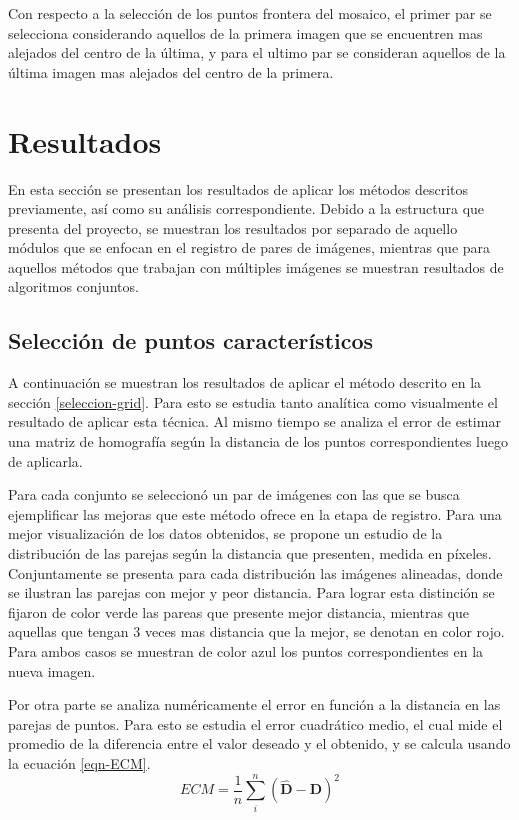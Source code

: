 Con respecto  a la selección de los puntos frontera del mosaico, el primer par se selecciona considerando aquellos de la primera imagen que se encuentren mas alejados del centro de la última, y para el ultimo par se consideran aquellos de la última imagen mas alejados del centro de la primera.

\section{Resultados}

En esta sección se presentan los resultados de aplicar los métodos descritos previamente, así como su análisis correspondiente. Debido a la estructura que presenta del proyecto, se muestran los resultados por separado de aquello módulos que se enfocan en el registro de pares de imágenes, mientras que para aquellos métodos que trabajan con múltiples imágenes se muestran resultados de algoritmos conjuntos.

\subsection*{Selección de puntos característicos}

A continuación se muestran los resultados de aplicar el método descrito en la 
sección \ref{seleccion-grid}. Para esto se estudia tanto analítica como visualmente el resultado de aplicar esta técnica. Al mismo tiempo se analiza el error de estimar una matriz de homografía según la distancia de los puntos correspondientes luego de aplicarla. 

Para cada conjunto se seleccionó un par de imágenes con las que se busca ejemplificar las mejoras que este método ofrece en la etapa de registro. Para una mejor visualización de los datos obtenidos, se propone un estudio de la distribución de las parejas según la distancia que presenten, medida en píxeles. Conjuntamente se presenta para cada distribución las imágenes alineadas, donde se ilustran las parejas con mejor y peor distancia. Para lograr esta distinción se fijaron de color verde las pareas que presente mejor distancia, mientras que aquellas que tengan 3 veces mas distancia que la mejor, se denotan en color rojo. Para ambos casos se muestran de color azul los puntos correspondientes en la nueva imagen.

Por otra parte se analiza numéricamente el error en función a la distancia en las parejas de puntos. Para esto se estudia el error cuadrático medio, el cual mide el promedio de la diferencia entre el valor deseado y el obtenido, y se calcula usando la ecuación \ref{eqn-ECM}.
\begin{equation}\label{eqn-ECM}
	ECM = \frac{1}{n} \sum_{i}^{n} \left( \hat{\mathbf{D}} - \mathbf{D} \right)^2
\end{equation}

